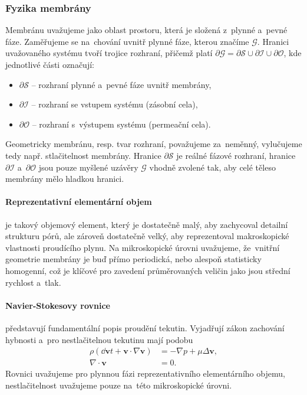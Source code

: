 \subsubsection{Fyzika membrány}\label{sss:fyzika_membrany}
Membránu uvažujeme jako oblast prostoru, která je složená z~plynné a~pevné fáze. Zaměřujeme se na~chování uvnitř plynné fáze, kterou značíme $\mathcal{G}$. Hranici uvažovaného systému tvoří trojice rozhraní, přičemž platí $\partial\mathcal{G}=\partial\mathcal{S}\cup\partial\mathcal{I}\cup\partial\mathcal{O}$, kde jednotlivé části označují:
\begin{itemize}
\item $\partial\mathcal{S}$ -- rozhraní plynné a~pevné fáze uvnitř membrány,
\item $\partial\mathcal{I}$ -- rozhraní se vstupem systému (zásobní cela),
\item $\partial\mathcal{O}$ -- rozhraní s~výstupem systému (permeační cela).
\end{itemize}
Geometricky membránu, resp. tvar rozhraní, považujeme za~neměnný, vylučujeme tedy např. stlačitelnost membrány. Hranice $\partial\mathcal{S}$ je reálné fázové rozhraní, hranice $\partial\mathcal{I}$ a~$\partial\mathcal{O}$ jsou pouze myšlené uzávěry $\mathcal{G}$ vhodně zvolené tak, aby celé těleso membrány mělo hladkou hranici.

\paragraph{Reprezentativní elementární objem}  je takový objemový element, který je dostatečně malý, aby zachycoval detailní strukturu pórů, ale zároveň dostatečně velký, aby reprezentoval makroskopické vlastnosti proudícího plynu. Na mikroskopické úrovni uvažujeme, že~vnitřní geometrie membrány je buď přímo periodická, nebo alespoň statisticky homogenní, což je klíčové pro zavedení průměrovaných veličin jako jsou střední rychlost a~tlak. 

\paragraph{Navier-Stokesovy rovnice} představují fundamentální popis proudění tekutin. Vyjadřují zákon zachování hybnosti a~pro nestlačitelnou tekutinu mají podobu
\begin{subequations}
    \begin{align}
    \rho\left(\dd{\bm{v}}{t}+\bm{v}\cdot\nabla\bm{v}\right)&=-\nabla p + \mu \Delta \bm{v},\\
    \nabla\cdot\bm{v}&=0.
    \end{align}
\end{subequations}
Rovnici uvažujeme pro plynnou fázi reprezentativního elementárního objemu, nestlačitelnost uvažujeme pouze na~této mikroskopické úrovni.

